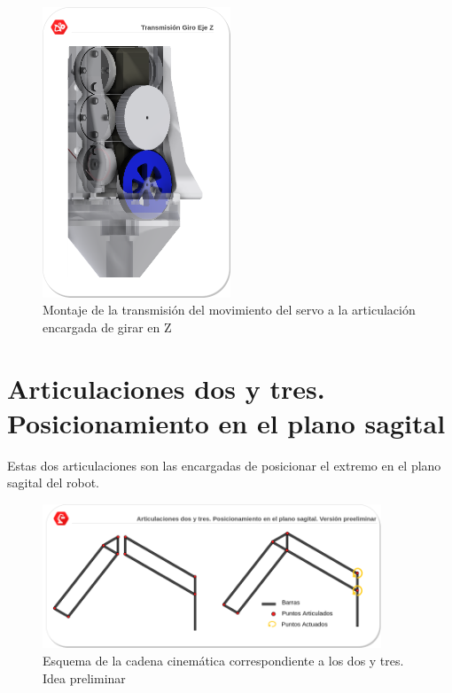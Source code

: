 	\begin{figure}[H]
		\centering
		\includegraphics[width=0.5\textwidth]{figuras/Imagenes_Mecanica/RuedasGiroZ.png}   
		\caption{Montaje de la transmisión del movimiento del servo a la articulación encargada de girar en Z}
		\label{fig:Mecanica:giro_z}
	\end{figure}

\section{Articulaciones dos y tres. Posicionamiento en el plano sagital} \label{sec:Mecanica:articulacion_dostres}
    Estas dos articulaciones son las encargadas de posicionar el extremo en el plano sagital del robot.
    \\ 
    
    \begin{figure}[H]
       	\centering
       	\includegraphics[width=0.9\textwidth]{figuras/Imagenes_Mecanica/mecanismos_4_barras_triangulo.png}   
       	\caption{Esquema de la cadena cinemática correspondiente a los  dos y tres. Idea preliminar}
       	\label{fig:Mecanica:4_bar_mecanism_triangle}
    \end{figure}
    
